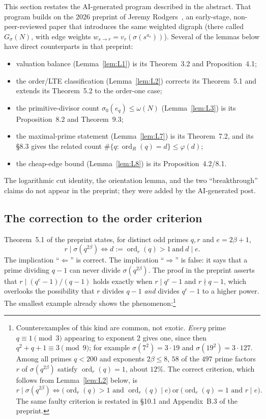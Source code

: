 \documentclass[11pt]{article}
\theoremstyle{definition}
\theoremstyle{remark}
\DeclareMathOperator{\ord}{ord}
\begin{document}
This section restates the AI-generated program described in the
abstract.  That program builds on the 2026 preprint of Jeremy
Rodgers~\cite{Rodgers}, an early-stage, non-peer-reviewed paper that
introduces the same weighted digraph (there called $G_\sigma(N)$, with edge
weights $w_{s\to r}=v_r(\sigma(s^{a_s}))$).  Several of the lemmas below have
direct counterparts in that preprint:
\begin{itemize}[leftmargin=1.5em]
\item valuation balance (Lemma~\ref{lem:L1}) is its Theorem~3.2 and
  Proposition~4.1;
\item the order/LTE classification (Lemma~\ref{lem:L2}) corrects its
  Theorem~5.1 and extends its Theorem~5.2 to the order-one case;
\item the primitive-divisor count $\sigma_0(e_q)\le\omega(N)$
  (Lemma~\ref{lem:L3}) is its Proposition~8.2 and Theorem~9.3;
\item the maximal-prime statement (Lemma~\ref{lem:L7}) is its
  Theorem~7.2, and its \S8.3 gives the related count
  $\#\{q:\ord_R(q)=d\}\le\varphi(d)$;
\item the cheap-edge bound (Lemma~\ref{lem:L8}) is its
  Proposition~4.2/8.1.
\end{itemize}
The logarithmic cut identity, the orientation lemma, and the two
``breakthrough'' claims do not appear in the preprint; they were added by the
AI-generated post.

\subsection{The correction to the order criterion}

Theorem~5.1 of the preprint states, for distinct odd primes $q,r$ and
$e=2\beta+1$,
\[
r\mid\sigma(q^{2\beta})\iff d:=\ord_r(q)>1\ \text{and}\ d\mid e .
\]
The implication ``$\Leftarrow$'' is correct.  The implication ``$\Rightarrow$''
is false: it says that a prime dividing $q-1$ can never divide
$\sigma(q^{2\beta})$.  The proof in the preprint asserts that
$r\mid(q^e-1)/(q-1)$ holds exactly when $r\mid q^e-1$ and $r\nmid q-1$, which
overlooks the possibility that $r$ divides $q-1$ \emph{and} divides
$q^e-1$ to a higher power.  The smallest example already shows the
phenomenon:\footnote{Counterexamples of this kind are common, not exotic.
\emph{Every} prime $q\equiv1\pmod3$ appearing to exponent $2$ gives one, since
then $q^2+q+1\equiv3\pmod9$; for example $\sigma(7^2)=3\cdot19$ and
$\sigma(19^2)=3\cdot127$.  Among all primes $q<200$ and exponents
$2\beta\le8$, $58$ of the $497$ prime factors $r$ of $\sigma(q^{2\beta})$
satisfy $\ord_r(q)=1$, about $12\%$.  The correct criterion, which follows
from Lemma~\ref{lem:L2} below, is
\[
r\mid\sigma(q^{2\beta})\iff
\bigl(\ord_r(q)>1\text{ and }\ord_r(q)\mid e\bigr)
\ \text{or}\
\bigl(\ord_r(q)=1\text{ and }r\mid e\bigr).
\]
The same faulty criterion is restated in \S10.1 and Appendix~B.3 of the
preprint.}
\end{document}
